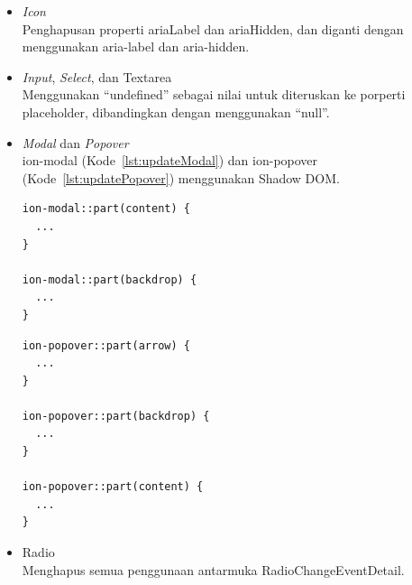 \begin{enumerate}
\begin{itemize}
		\item \textit{Icon} \\
		Penghapusan properti ariaLabel dan ariaHidden, dan diganti dengan menggunakan aria-label dan aria-hidden.
		\item \textit{Input}, \textit{Select}, dan Textarea \\
		Menggunakan ``undefined'' sebagai nilai untuk diteruskan ke porperti placeholder, dibandingkan dengan menggunakan ``null''.	
		
		\item \textit{Modal} dan \textit{Popover} \\
		ion-modal (Kode~\ref{lst:updateModal}) dan ion-popover (Kode~\ref{lst:updatePopover}) menggunakan Shadow DOM.
		
\begin{lstlisting}[label={lst:updateModal}, caption=Kode ion-modal menggunakan Shadow DOM pada CSS]
ion-modal::part(content) {
  ...
}

ion-modal::part(backdrop) {
  ...
}
\end{lstlisting} 

\begin{lstlisting}[label={lst:updatePopover}, caption=Kode ion-popover menggunakan Shadow DOM pada CSS]
ion-popover::part(arrow) {
  ...
}

ion-popover::part(backdrop) {
  ...
}

ion-popover::part(content) {
  ...
}
\end{lstlisting} 

		\item Radio \\
		Menghapus semua penggunaan antarmuka RadioChangeEventDetail.
		
	\end{itemize}
\end{enumerate}



